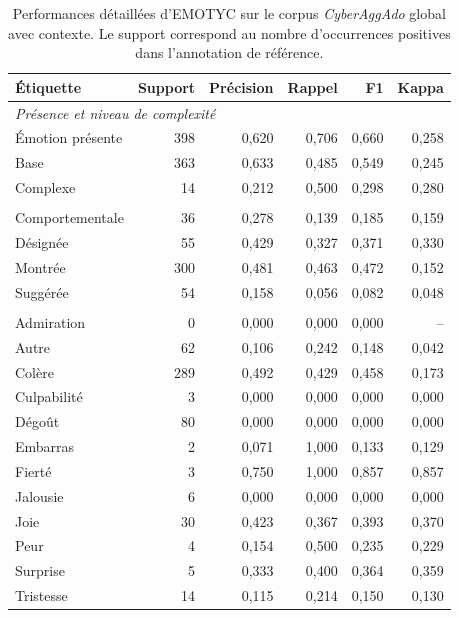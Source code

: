 \begin{table}[htbp]
  \centering
  \scriptsize
  \setlength{\tabcolsep}{5pt}
  \begin{tabular}{lrrrrr}
    \toprule
    Étiquette & Support & Précision & Rappel & F1 & Kappa \\
    \midrule
    \multicolumn{6}{l}{\textit{Présence et niveau de complexité}} \\
    Émotion présente & 398 & 0,620 & 0,706 & 0,660 & 0,258 \\
    Base & 363 & 0,633 & 0,485 & 0,549 & 0,245 \\
    Complexe & 14 & 0,212 & 0,500 & 0,298 & 0,280 \\
    \addlinespace
    \multicolumn{6}{l}{\textit{Modes d'expression}} \\
    Comportementale & 36 & 0,278 & 0,139 & 0,185 & 0,159 \\
    Désignée & 55 & 0,429 & 0,327 & 0,371 & 0,330 \\
    Montrée & 300 & 0,481 & 0,463 & 0,472 & 0,152 \\
    Suggérée & 54 & 0,158 & 0,056 & 0,082 & 0,048 \\
    \addlinespace
    \multicolumn{6}{l}{\textit{Catégories émotionnelles}} \\
    Admiration & 0 & 0,000 & 0,000 & 0,000 & -- \\
    Autre & 62 & 0,106 & 0,242 & 0,148 & 0,042 \\
    Colère & 289 & 0,492 & 0,429 & 0,458 & 0,173 \\
    Culpabilité & 3 & 0,000 & 0,000 & 0,000 & 0,000 \\
    Dégoût & 80 & 0,000 & 0,000 & 0,000 & 0,000 \\
    Embarras & 2 & 0,071 & 1,000 & 0,133 & 0,129 \\
    Fierté & 3 & 0,750 & 1,000 & 0,857 & 0,857 \\
    Jalousie & 6 & 0,000 & 0,000 & 0,000 & 0,000 \\
    Joie & 30 & 0,423 & 0,367 & 0,393 & 0,370 \\
    Peur & 4 & 0,154 & 0,500 & 0,235 & 0,229 \\
    Surprise & 5 & 0,333 & 0,400 & 0,364 & 0,359 \\
    Tristesse & 14 & 0,115 & 0,214 & 0,150 & 0,130 \\
    \bottomrule
  \end{tabular}
  \caption{Performances détaillées d'EMOTYC sur le corpus \textit{CyberAggAdo} global avec contexte. Le support correspond au nombre d'occurrences positives dans l'annotation de référence.}
  \label{tab:perf-cyberaggado}
\end{table}

